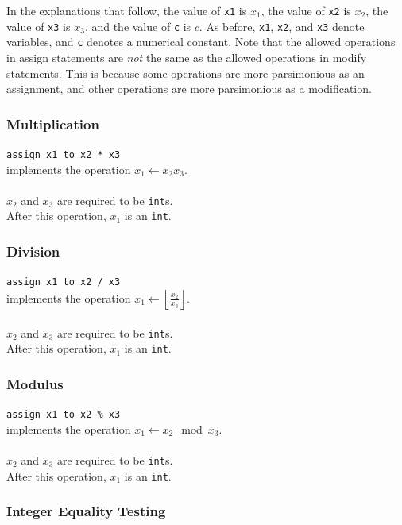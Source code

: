 \documentclass[11pt]{report}
\begin{document}
In the explanations that follow, the value of \texttt{x1} is $x_1$, the value of \texttt{x2} is $x_2$, the value of \texttt{x3} is $x_3$, and the value of \texttt{c} is $c$. As before, \texttt{x1}, \texttt{x2}, and \texttt{x3} denote variables, and \texttt{c} denotes a numerical constant. Note that the allowed operations in assign statements are \emph{not} the same as the allowed operations in modify statements. This is because some operations are more parsimonious as an assignment, and other operations are more parsimonious as a modification.

\subsubsection{Multiplication}

\texttt{assign x1 to x2 * x3} \\
implements the operation $x_1 \leftarrow x_2 x_3$. \\ \\
$x_2$ and $x_3$ are required to be \texttt{int}s. \\
After this operation, $x_1$ is an \texttt{int}.

\subsubsection{Division} 

\texttt{assign x1 to x2 / x3} \\
implements the operation $x_1 \leftarrow \left \lfloor{\frac{x_2}{x_3}}\right \rfloor$. \\ \\
$x_2$ and $x_3$ are required to be \texttt{int}s. \\
After this operation, $x_1$ is an \texttt{int}.

\subsubsection{Modulus} 

\texttt{assign x1 to x2 \% x3} \\
implements the operation $x_1 \leftarrow x_2\mod x_3$. \\ \\
$x_2$ and $x_3$ are required to be \texttt{int}s. \\
After this operation, $x_1$ is an \texttt{int}.

\subsubsection{Integer Equality Testing}
\end{document}
